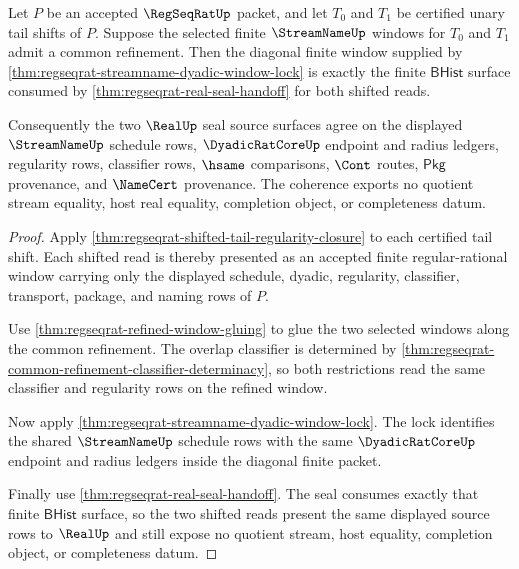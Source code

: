 \begin{theorem}
\label{thm:regseqrat-tail-seal-diagonal-window-coherence}
Let $P$ be an accepted $\RegSeqRatUp$ packet, and let $T_0$ and $T_1$ be
certified unary tail shifts of $P$. Suppose the selected finite
$\StreamNameUp$ windows for $T_0$ and $T_1$ admit a common refinement. Then the
diagonal finite window supplied by
\autoref{thm:regseqrat-streamname-dyadic-window-lock} is exactly the finite
$\mathsf{BHist}$ surface consumed by
\autoref{thm:regseqrat-real-seal-handoff} for both shifted reads.

Consequently the two $\RealUp$ seal source surfaces agree on the displayed
$\StreamNameUp$ schedule rows, $\DyadicRatCoreUp$ endpoint and radius ledgers,
regularity rows, classifier rows, $\hsame$ comparisons, $\Cont$ routes,
$\mathsf{Pkg}$ provenance, and $\NameCert$ provenance. The coherence exports no
quotient stream equality, host real equality, completion object, or
completeness datum.
\end{theorem}
\begin{proof}
Apply \autoref{thm:regseqrat-shifted-tail-regularity-closure} to each
certified tail shift. Each shifted read is thereby presented as an accepted
finite regular-rational window carrying only the displayed schedule, dyadic,
regularity, classifier, transport, package, and naming rows of $P$.

Use \autoref{thm:regseqrat-refined-window-gluing} to glue the two selected
windows along the common refinement. The overlap classifier is determined by
\autoref{thm:regseqrat-common-refinement-classifier-determinacy}, so both
restrictions read the same classifier and regularity rows on the refined
window.

Now apply \autoref{thm:regseqrat-streamname-dyadic-window-lock}. The lock
identifies the shared $\StreamNameUp$ schedule rows with the same
$\DyadicRatCoreUp$ endpoint and radius ledgers inside the diagonal finite
packet.

Finally use \autoref{thm:regseqrat-real-seal-handoff}. The seal consumes
exactly that finite $\mathsf{BHist}$ surface, so the two shifted reads present
the same displayed source rows to $\RealUp$ and still expose no quotient
stream, host equality, completion object, or completeness datum.
\end{proof}

